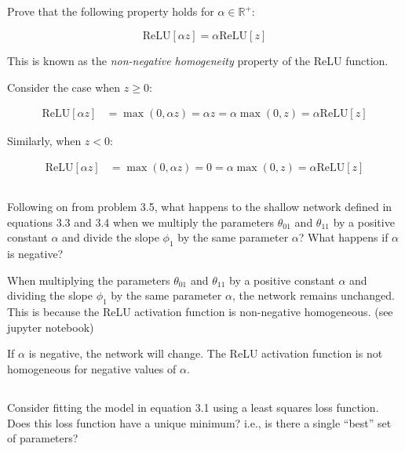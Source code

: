 \documentclass[12pt]{report}
\begin{document}
\subsection{}
\begin{mdframed}
    Prove that the following property holds for $\alpha \in \mathbb{R}^{+}$:

    \begin{equation*}
        \text{ReLU}[\alpha z] = \alpha \text{ReLU}[z]
    \end{equation*}

    This is known as the \textit{non-negative homogeneity} property of the ReLU function.
\end{mdframed}

Consider the case when $z \geq 0$:

\begin{align*}
    \text{ReLU}[\alpha z] & = \max(0, \alpha z) = \alpha z = \alpha \max(0, z) = \alpha \text{ReLU}[z]
\end{align*}

Similarly, when $z < 0$:

\begin{align*}
    \text{ReLU}[\alpha z] & = \max(0, \alpha z) = 0 = \alpha \max(0, z) = \alpha \text{ReLU}[z]
\end{align*}

\subsection{}
\begin{mdframed}
    Following on from problem 3.5, what happens to the shallow network defined in equations 3.3 and 3.4 when we multiply the parameters $\theta_{01}$ and $\theta_{11}$ by a positive constant $\alpha$ and divide the slope $\phi_1$ by the same parameter $\alpha$? What happens if $\alpha$ is negative?
\end{mdframed}

When multiplying the parameters $\theta_{01}$ and $\theta_{11}$ by a positive constant $\alpha$ and dividing the slope $\phi_1$ by the same parameter $\alpha$, the network remains unchanged. This is because the ReLU activation function is non-negative homogeneous. (see jupyter notebook)

If $\alpha$ is negative, the network will change. The ReLU activation function is not homogeneous for negative values of $\alpha$.

\subsection{}
\begin{mdframed}
    Consider fitting the model in equation 3.1 using a least squares loss function. Does this loss function have a unique minimum? i.e., is there a single “best” set of parameters?
\end{mdframed}
\end{document}
